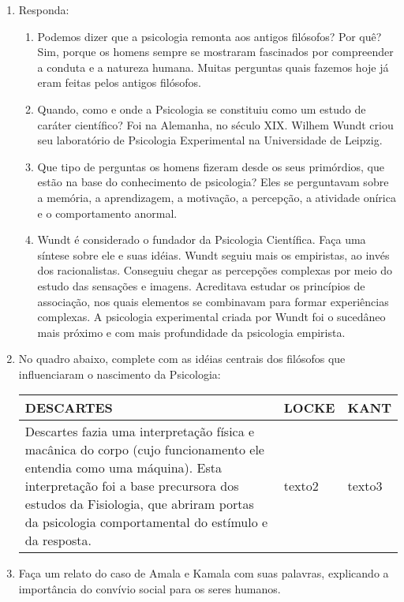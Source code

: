 \documentclass[a4paper, 12pt]{article}
\begin{document}
\begin{enumerate}
  
\item Responda: 
  \begin{enumerate}
  \item Podemos dizer que a psicologia remonta aos antigos filósofos? Por quê? \newline \newline
    Sim, porque os homens sempre se mostraram fascinados por compreender a conduta e a natureza humana. Muitas perguntas quais fazemos hoje já eram feitas pelos antigos filósofos. \newline
  \item Quando, como e onde a Psicologia se constituiu como um estudo de caráter científico? \newline \newline
  Foi na Alemanha, no século XIX. Wilhem Wundt criou seu laboratório de Psicologia Experimental na Universidade de Leipzig. \newline 
  \item Que tipo de perguntas os homens fizeram desde os seus primórdios, que estão na base do conhecimento de psicologia? \newline \newline
  Eles se perguntavam sobre a memória, a aprendizagem, a motivação, a percepção, a atividade onírica e o comportamento anormal. \newline
  \item Wundt é considerado o fundador da Psicologia Científica. Faça uma síntese sobre ele e suas idéias. \newline \newline
    Wundt seguiu mais os empiristas, ao invés dos racionalistas. Conseguiu chegar as percepções complexas por meio do estudo das sensações e imagens. Acreditava estudar os princípios de associação, nos quais elementos se combinavam para formar experiências complexas. A psicologia experimental criada por Wundt foi o sucedâneo mais próximo e com mais profundidade da psicologia empirista.
    \newline
  \end{enumerate}

\item No quadro abaixo, complete com as idéias centrais dos filósofos que influenciaram o nascimento da Psicologia: \newline \newline
  \centering
  \begin{tabular}{| m{4cm} | m{4cm} | m{4cm} |}
    \hline
    \textbf{DESCARTES} & \textbf{LOCKE} & \textbf{KANT} \\ \hline
    Descartes fazia uma interpretação física e macânica do corpo (cujo funcionamento ele entendia como uma máquina). Esta interpretação foi a base precursora dos estudos da Fisiologia, que abriram portas  da psicologia comportamental do estímulo e da resposta. & texto2 & texto3 \\ \hline
  \end{tabular} \newline
  
\item Faça um relato do caso de Amala e Kamala com suas palavras, explicando a importância do convívio social para os seres humanos.
\end{enumerate}
\end{document}
